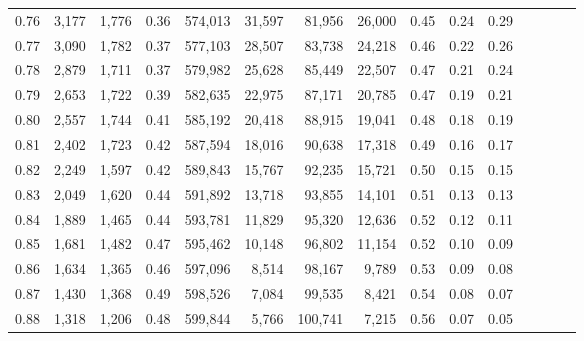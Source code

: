 \begin{tabular}{rrrcrrrrrrrrrrr}
0.76 &   3,177 &  1,776 &                                       0.36 &  574,013 &   31,597 &   81,956 &   26,000 &  0.45 &  0.24 &                         0.29 \\
0.77 &   3,090 &  1,782 &                                       0.37 &  577,103 &   28,507 &   83,738 &   24,218 &  0.46 &  0.22 &                         0.26 \\
0.78 &   2,879 &  1,711 &                                       0.37 &  579,982 &   25,628 &   85,449 &   22,507 &  0.47 &  0.21 &                         0.24 \\
0.79 &   2,653 &  1,722 &                                       0.39 &  582,635 &   22,975 &   87,171 &   20,785 &  0.47 &  0.19 &                         0.21 \\
0.80 &   2,557 &  1,744 &                                       0.41 &  585,192 &   20,418 &   88,915 &   19,041 &  0.48 &  0.18 &                         0.19 \\
0.81 &   2,402 &  1,723 &                                       0.42 &  587,594 &   18,016 &   90,638 &   17,318 &  0.49 &  0.16 &                         0.17 \\
0.82 &   2,249 &  1,597 &                                       0.42 &  589,843 &   15,767 &   92,235 &   15,721 &  0.50 &  0.15 &                         0.15 \\
0.83 &   2,049 &  1,620 &                                       0.44 &  591,892 &   13,718 &   93,855 &   14,101 &  0.51 &  0.13 &                         0.13 \\
0.84 &   1,889 &  1,465 &                                       0.44 &  593,781 &   11,829 &   95,320 &   12,636 &  0.52 &  0.12 &                         0.11 \\
0.85 &   1,681 &  1,482 &                                       0.47 &  595,462 &   10,148 &   96,802 &   11,154 &  0.52 &  0.10 &                         0.09 \\
0.86 &   1,634 &  1,365 &                                       0.46 &  597,096 &    8,514 &   98,167 &    9,789 &  0.53 &  0.09 &                         0.08 \\
0.87 &   1,430 &  1,368 &                                       0.49 &  598,526 &    7,084 &   99,535 &    8,421 &  0.54 &  0.08 &                         0.07 \\
0.88 &   1,318 &  1,206 &                                       0.48 &  599,844 &    5,766 &  100,741 &    7,215 &  0.56 &  0.07 &                         0.05 \\

\end{tabular}

